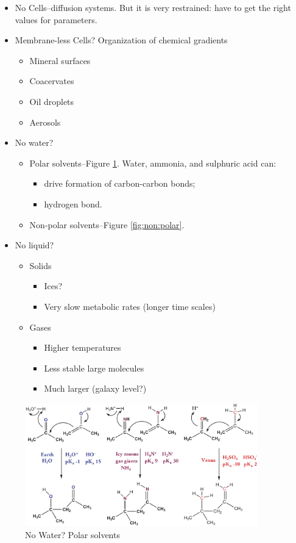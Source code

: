 \documentclass[]{article}
\begin{document}
\begin{itemize}
	\item No Cells--diffusion systems. But it is very restrained: have to get the right values for parameters.
	\item Membrane-less Cells? Organization of 	chemical gradients\cite{hollants2011life}\cite{kim2001life}
	\begin{itemize}
		\item Mineral surfaces
		\item Coacervates
		\item Oil droplets
		\item Aerosols
	\end{itemize}
	\item No water? 
	\begin{itemize}
		\item Polar solvents\cite[Chapter 6]{board2007limits}--Figure \ref{fig:no:water}. Water, ammonia, and sulphuric acid can:
		\begin{itemize}
			\item drive formation of carbon-carbon bonds;
			\item hydrogen bond.
		\end{itemize}
		\item Non-polar solvents\cite{cejkova2014dynamics}--Figure \ref{fig:non:polar}.
	\end{itemize}
	\item No liquid?\cite[Chapter 6]{board2007limits}
	\begin{itemize}
		\item Solids
		\begin{itemize}
			\item Ices?
			\item Very slow metabolic rates (longer time scales)
		\end{itemize}
		\item Gases
		\begin{itemize}
			\item Higher temperatures
			\item Less stable large molecules
			\item Much larger (galaxy level?)
		\end{itemize}
	\end{itemize}
\end{itemize}


\begin{figure}[H]
	\caption{No Water? Polar solvents}\label{fig:no:water}
	\includegraphics[width=0.9\textwidth]{NoWater}
\end{figure}
\end{document}
